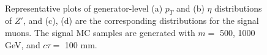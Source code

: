 \begin{figure}[!htb]
    \centering
     \\
    \caption{Representative plots of generator-level (a) $p_{T}$ and (b) $\eta$ distributions of $Z'$, and (c), (d) are the corresponding distributions for the signal muons. The signal MC samples are generated with $m=$ 500, 1000 GeV, and $c\tau=$ 100 mm.}
    \label{fig:truth_zp_muon}
\end{figure}


